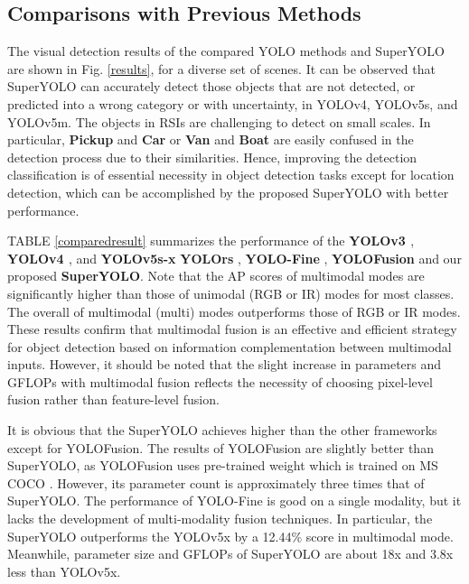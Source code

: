 \subsection{Comparisons with Previous Methods}
The visual detection results of the compared YOLO methods and SuperYOLO are shown in Fig. \ref{results}, for a diverse set of scenes. It can be observed that SuperYOLO can accurately detect those objects that are not detected, or predicted into a wrong category or with uncertainty, in YOLOv4, YOLOv5s, and YOLOv5m. The objects in RSIs are challenging to detect on small scales. In particular, \textbf{Pickup} and \textbf{Car} or \textbf{Van} and \textbf{Boat} are easily confused in the detection process due to their similarities. Hence, improving the detection classification is of essential necessity in object detection tasks except for location detection, which can be accomplished by the proposed SuperYOLO with better performance. 

TABLE \ref{comparedresult} summarizes the performance of the \textbf{YOLOv3 \cite{redmon2018yolov3}}, \textbf{YOLOv4  \cite{bochkovskiy2020yolov4}}, and \textbf{YOLOv5s-x} \cite{yolov5} \textbf{YOLOrs } \cite{9273212}, \textbf{YOLO-Fine} \cite{pham2020yolo}, \textbf{YOLOFusion} \cite{qingyun2022cross} and our proposed \textbf{SuperYOLO}. Note that the AP scores of multimodal modes are significantly higher than those of unimodal (RGB or IR) modes for most classes. The overall  of multimodal (multi) modes outperforms those of RGB or IR modes. These results confirm that multimodal fusion is an effective and efficient strategy for object detection based on information complementation between multimodal inputs. However, it should be noted that the slight increase in parameters and GFLOPs with multimodal fusion reflects the necessity of choosing pixel-level fusion rather than feature-level fusion.

It is obvious that the SuperYOLO achieves higher  than the other frameworks except for YOLOFusion. The results of YOLOFusion are slightly better than SuperYOLO, as YOLOFusion uses pre-trained weight which is trained on MS COCO \cite{lin2014microsoft}. However, its parameter count is approximately three times that of SuperYOLO. The performance of YOLO-Fine is good on a single modality, but it lacks the development of multi-modality fusion techniques. In particular, the SuperYOLO outperforms the YOLOv5x by a 12.44\%  score in multimodal mode. Meanwhile, parameter size and GFLOPs of SuperYOLO are about 18x and 3.8x less than YOLOv5x. 

